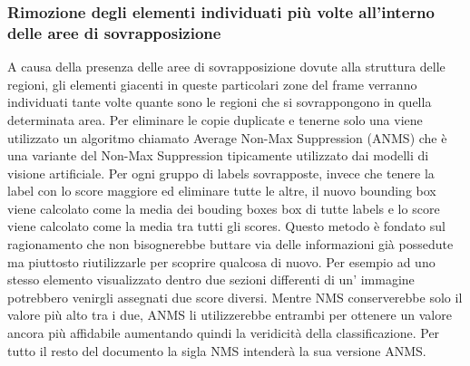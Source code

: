 \subsubsection{Rimozione degli elementi individuati più volte all'interno delle aree di sovrapposizione}
A causa della presenza delle aree di sovrapposizione dovute alla struttura delle regioni, gli elementi giacenti in queste particolari zone del frame verranno individuati tante volte quante sono le regioni che si sovrappongono in quella determinata area. Per eliminare le copie duplicate e tenerne solo una viene utilizzato un algoritmo chiamato Average Non-Max Suppression (ANMS) che è una variante del Non-Max Suppression tipicamente utilizzato dai modelli di visione artificiale. Per ogni gruppo di labels sovrapposte, invece che tenere la label con lo score maggiore ed eliminare tutte le altre, il nuovo bounding box viene calcolato come la media dei bouding boxes box di tutte labels e lo score viene calcolato come la media tra tutti gli scores.
Questo metodo è fondato sul ragionamento che non bisognerebbe buttare via delle informazioni già possedute ma piuttosto riutilizzarle per scoprire qualcosa di nuovo. Per esempio ad uno stesso elemento visualizzato dentro due sezioni differenti di un' immagine potrebbero venirgli assegnati due score diversi. Mentre NMS conserverebbe solo il valore più alto tra i due, ANMS li utilizzerebbe entrambi per ottenere un valore ancora più affidabile aumentando quindi la veridicità della classificazione. Per tutto il resto del documento la sigla NMS intenderà la sua versione ANMS.
